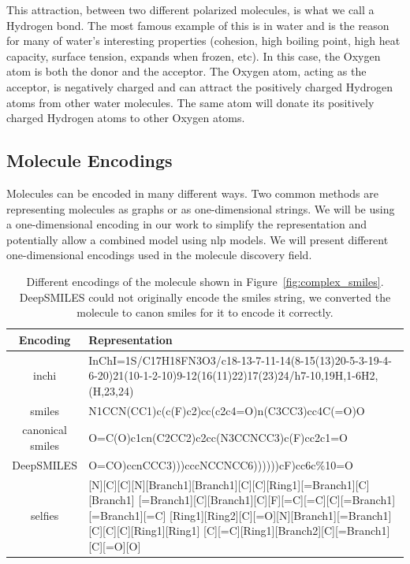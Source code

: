 \documentclass[../Document.tex]{subfiles}
\begin{document}
This attraction, between two different polarized molecules, is what we call a Hydrogen bond. The most famous example of this is in water and is the reason for many of water's interesting properties (cohesion, high boiling point, high heat capacity, surface tension, expands when frozen, etc). In this case, the Oxygen atom is both the donor and the acceptor. The Oxygen atom, acting as the acceptor, is negatively charged and can attract the positively charged Hydrogen atoms from other water molecules. The same atom will donate its positively charged Hydrogen atoms to other Oxygen atoms.


\subsection{Molecule Encodings}
\label{sec:molecule-encodings}
Molecules can be encoded in many different ways. Two common methods are representing molecules as graphs or as one-dimensional strings.
We will be using a one-dimensional encoding in our work to simplify the representation and potentially allow a combined model using \gls{nlp} models.
We will present different one-dimensional encodings used in the molecule discovery field.


\begin{table}[t]
    \centering
    \begin{tabular}{|c|p{5in}|}
        \hline
        Encoding & Representation \\
        \hline
        \acrshort{inchi} & InChI=1S/C17H18FN3O3/c18-13-7-11-14(8-15(13)20-5-3-19-4-6-20)21(10-1-2-10)9-12(16(11)22)17(23)24/h7-10,19H,1-6H2,(H,23,24)\\
        \hline
        \acrshort{smiles} & 
        N1CCN(CC1)c(c(F)c2)cc(c2c4=O)n(C3CC3)cc4C(=O)O
        \\
        \hline
        canonical \acrshort{smiles} & O=C(O)c1cn(C2CC2)c2cc(N3CCNCC3)c(F)cc2c1=O\\
        \hline
        DeepSMILES & O=CO)ccnCCC3)))cccNCCNCC6))))))cF)cc6c\%10=O\\
        \hline
        \acrshort{selfies} & [N][C][C][N][Branch1][Branch1][C][C][Ring1][=Branch1][C][Branch1]
        [=Branch1][C][Branch1][C][F][=C][=C][C][=Branch1][=Branch1][=C]
        [Ring1][Ring2][C][=O][N][Branch1][=Branch1][C][C][C][Ring1][Ring1]
        [C][=C][Ring1][Branch2][C][=Branch1][C][=O][O]\\
        \hline
    \end{tabular}
    \caption[Different encodings of the molecule shown in Figure~\ref{fig:complex_smiles}]{Different encodings of the molecule shown in Figure~\ref{fig:complex_smiles}. DeepSMILES could not originally encode the \gls{smiles} string, we converted the molecule to canon \gls{smiles} for it to encode it correctly.}
    \label{tab:different_encodings}
\end{table}
\end{document}
